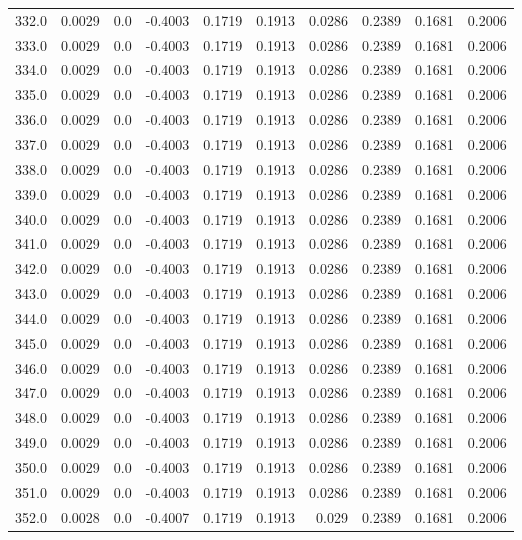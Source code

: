 \begin{longtable}{lrrrrrrrrr}
332.0 & 0.0029 & 0.0 & -0.4003 & 0.1719 & 0.1913 & 0.0286 & 0.2389 & 0.1681 & 0.2006 \\
333.0 & 0.0029 & 0.0 & -0.4003 & 0.1719 & 0.1913 & 0.0286 & 0.2389 & 0.1681 & 0.2006 \\
334.0 & 0.0029 & 0.0 & -0.4003 & 0.1719 & 0.1913 & 0.0286 & 0.2389 & 0.1681 & 0.2006 \\
335.0 & 0.0029 & 0.0 & -0.4003 & 0.1719 & 0.1913 & 0.0286 & 0.2389 & 0.1681 & 0.2006 \\
336.0 & 0.0029 & 0.0 & -0.4003 & 0.1719 & 0.1913 & 0.0286 & 0.2389 & 0.1681 & 0.2006 \\
337.0 & 0.0029 & 0.0 & -0.4003 & 0.1719 & 0.1913 & 0.0286 & 0.2389 & 0.1681 & 0.2006 \\
338.0 & 0.0029 & 0.0 & -0.4003 & 0.1719 & 0.1913 & 0.0286 & 0.2389 & 0.1681 & 0.2006 \\
339.0 & 0.0029 & 0.0 & -0.4003 & 0.1719 & 0.1913 & 0.0286 & 0.2389 & 0.1681 & 0.2006 \\
340.0 & 0.0029 & 0.0 & -0.4003 & 0.1719 & 0.1913 & 0.0286 & 0.2389 & 0.1681 & 0.2006 \\
341.0 & 0.0029 & 0.0 & -0.4003 & 0.1719 & 0.1913 & 0.0286 & 0.2389 & 0.1681 & 0.2006 \\
342.0 & 0.0029 & 0.0 & -0.4003 & 0.1719 & 0.1913 & 0.0286 & 0.2389 & 0.1681 & 0.2006 \\
343.0 & 0.0029 & 0.0 & -0.4003 & 0.1719 & 0.1913 & 0.0286 & 0.2389 & 0.1681 & 0.2006 \\
344.0 & 0.0029 & 0.0 & -0.4003 & 0.1719 & 0.1913 & 0.0286 & 0.2389 & 0.1681 & 0.2006 \\
345.0 & 0.0029 & 0.0 & -0.4003 & 0.1719 & 0.1913 & 0.0286 & 0.2389 & 0.1681 & 0.2006 \\
346.0 & 0.0029 & 0.0 & -0.4003 & 0.1719 & 0.1913 & 0.0286 & 0.2389 & 0.1681 & 0.2006 \\
347.0 & 0.0029 & 0.0 & -0.4003 & 0.1719 & 0.1913 & 0.0286 & 0.2389 & 0.1681 & 0.2006 \\
348.0 & 0.0029 & 0.0 & -0.4003 & 0.1719 & 0.1913 & 0.0286 & 0.2389 & 0.1681 & 0.2006 \\
349.0 & 0.0029 & 0.0 & -0.4003 & 0.1719 & 0.1913 & 0.0286 & 0.2389 & 0.1681 & 0.2006 \\
350.0 & 0.0029 & 0.0 & -0.4003 & 0.1719 & 0.1913 & 0.0286 & 0.2389 & 0.1681 & 0.2006 \\
351.0 & 0.0029 & 0.0 & -0.4003 & 0.1719 & 0.1913 & 0.0286 & 0.2389 & 0.1681 & 0.2006 \\
352.0 & 0.0028 & 0.0 & -0.4007 & 0.1719 & 0.1913 & 0.029 & 0.2389 & 0.1681 & 0.2006 \\

\end{longtable}
